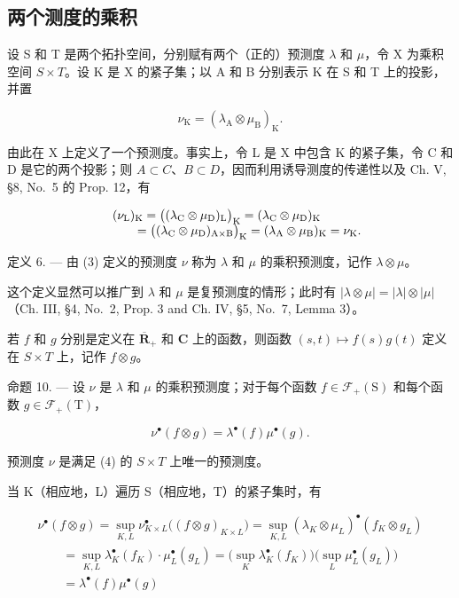 \subsection{两个测度的乘积}

设 S 和 T 是两个拓扑空间，分别赋有两个（正的）预测度 \(\lambda\) 和 \(\mu\)，令 X 为乘积空间 \(S \times T\)。设 K 是 X 的紧子集；以 A 和 B 分别表示 K 在 S 和 T 上的投影，并置

\[
\nu_ {\mathrm{K}} = \left(\lambda_ {\mathrm{A}} \otimes \mu_ {\mathrm{B}}\right) _ {\mathrm{K}}.\tag{3}
\]

由此在 X 上定义了一个预测度。事实上，令 L 是 X 中包含 K 的紧子集，令 C 和 D 是它的两个投影；则 \(A \subset C\)、\(B \subset D\)，因而利用诱导测度的传递性以及 Ch. V, §8, No.~5 的 Prop. 12，有

\[
\begin{array}{r l} & {(\nu_ {\mathrm{L}}) _ {\mathrm{K}} = \big ((\lambda_ {\mathrm{C}} \otimes \mu_ {\mathrm{D}}) _ {\mathrm{L}} \big) _ {\mathrm{K}} = (\lambda_ {\mathrm{C}} \otimes \mu_ {\mathrm{D}}) _ {\mathrm{K}}} \\ & {\qquad = \big ((\lambda_ {\mathrm{C}} \otimes \mu_ {\mathrm{D}}) _ {\mathrm{A} \times \mathrm{B}} \big) _ {\mathrm{K}} = (\lambda_ {\mathrm{A}} \otimes \mu_ {\mathrm{B}}) _ {\mathrm{K}} = \nu_ {\mathrm{K}}.} \end{array}
\]

定义 6. --- 由 (3) 定义的预测度 \(\nu\) 称为 \(\lambda\) 和 \(\mu\) 的乘积预测度，记作 \(\lambda \otimes \mu\)。

这个定义显然可以推广到 \(\lambda\) 和 \(\mu\) 是复预测度的情形；此时有 \(|\lambda\otimes\mu|=|\lambda|\otimes|\mu|\)（Ch. III, §4, No.~2, Prop. 3 and Ch. IV, §5, No.~7, Lemma 3）。

若 \(f\) 和 \(g\) 分别是定义在 \(\overline{\mathbf{R}}_+\) 和 \(\mathbf{C}\) 上的函数，则函数 \((s,t)\mapsto f(s)g(t)\) 定义在 \(S\times T\) 上，记作 \(f\otimes g\)。

命题 10. --- 设 \(\nu\) 是 \(\lambda\) 和 \(\mu\) 的乘积预测度；对于每个函数 \(f \in \mathcal{F}_{+}(\mathrm{S})\) 和每个函数 \(g \in \mathcal{F}_{+}(\mathrm{T})\)，

\[
\nu^ {\bullet} (f \otimes g) = \lambda^ {\bullet} (f) \mu^ {\bullet} (g).\tag{4}
\]

预测度 \(\nu\) 是满足 (4) 的 \(S \times T\) 上唯一的预测度。

当 K（相应地，L）遍历 S（相应地，T）的紧子集时，有

\[
\begin{array}{l} \nu^ {\bullet} (f \otimes g) = \sup _ {K, L} \nu_ {K \times L} ^ {\bullet} \big ((f \otimes g) _ {K \times L} \big) = \sup _ {K, L} (\lambda_ {K} \otimes \mu_ {L}) ^ {\bullet} (f _ {K} \otimes g _ {L}) \\ \qquad = \sup _ {K, L} \lambda_ {K} ^ {\bullet} (f _ {K}) \cdot \mu_ {L} ^ {\bullet} (g _ {L}) = \big (\sup _ {K} \lambda_ {K} ^ {\bullet} (f _ {K}) \big) \big (\sup _ {L} \mu_ {L} ^ {\bullet} (g _ {L}) \big) \\ \qquad = \lambda^ {\bullet} (f) \mu^ {\bullet} (g) \end{array}
\]

